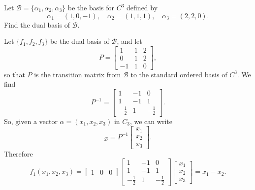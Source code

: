  Let $\mathcal{B} = \{\alpha_1,\alpha_2,\alpha_3\}$ be the
basis for $C^3$ defined by
\begin{equation*}
  \alpha_1 = (1,0,-1), \quad
  \alpha_2 = (1,1,1), \quad
  \alpha_3 = (2,2,0).
\end{equation*}
Find the dual basis of $\mathcal{B}$.
\begin{solution}
  Let $\{f_1,f_2,f_3\}$ be the dual basis of $\mathcal{B}$, and let
  \begin{equation*}
    P =
    \begin{bmatrix}
      1 & 1 & 2 \\
      0 & 1 & 2 \\
      -1 & 1 & 0
    \end{bmatrix},
  \end{equation*}
  so that $P$ is the transition matrix from $\mathcal{B}$ to the
  standard ordered basis of $C^3$. We find
  \begin{equation*}
    P^{-1} =
    \begin{bmatrix}
      1 & -1 & 0 \\[3pt]
      1 & -1 & 1 \\[3pt]
      -\frac12 & 1 & -\frac12
    \end{bmatrix}.
  \end{equation*}
  So, given a vector $\alpha = (x_1,x_2,x_3)$ in $C_3$, we can write
  \begin{equation*}
    [\alpha]_{\mathcal{B}} = P^{-1}
    \begin{bmatrix}
      x_1 \\ x_2 \\ x_3
    \end{bmatrix}.
  \end{equation*}
  Therefore
  \begin{equation*}
    f_1(x_1,x_2,x_3) =
    \begin{bmatrix}
      1 & 0 & 0
    \end{bmatrix}
    \begin{bmatrix}
      1 & -1 & 0 \\[3pt]
      1 & -1 & 1 \\[3pt]
      -\frac12 & 1 & -\frac12
    \end{bmatrix}
    \begin{bmatrix}
      x_1 \\ x_2 \\ x_3
    \end{bmatrix}
    = x_1 - x_2.
  \end{equation*}

\end{solution}
